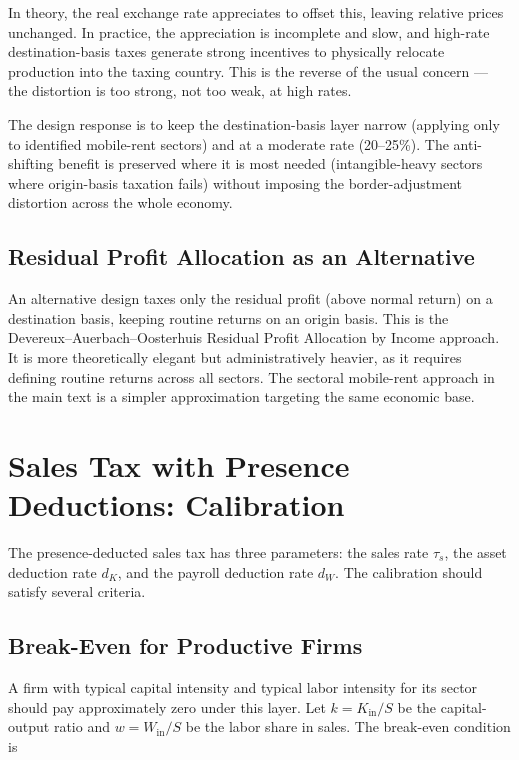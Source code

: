 \documentclass[11pt,a4paper]{article}
\begin{document}
In theory, the real exchange rate appreciates to offset this, leaving relative prices unchanged. In practice, the appreciation is incomplete and slow, and high-rate destination-basis taxes generate strong incentives to physically relocate production into the taxing country. This is the reverse of the usual concern — the distortion is too strong, not too weak, at high rates.

The design response is to keep the destination-basis layer narrow (applying only to identified mobile-rent sectors) and at a moderate rate (20--25\%). The anti-shifting benefit is preserved where it is most needed (intangible-heavy sectors where origin-basis taxation fails) without imposing the border-adjustment distortion across the whole economy.

\subsection{Residual Profit Allocation as an Alternative}

An alternative design taxes only the residual profit (above normal return) on a destination basis, keeping routine returns on an origin basis. This is the Devereux--Auerbach--Oosterhuis Residual Profit Allocation by Income approach. It is more theoretically elegant but administratively heavier, as it requires defining routine returns across all sectors. The sectoral mobile-rent approach in the main text is a simpler approximation targeting the same economic base.

\section{Sales Tax with Presence Deductions: Calibration}

The presence-deducted sales tax has three parameters: the sales rate $\tau_s$, the asset deduction rate $d_K$, and the payroll deduction rate $d_W$. The calibration should satisfy several criteria.

\subsection{Break-Even for Productive Firms}

A firm with typical capital intensity and typical labor intensity for its sector should pay approximately zero under this layer. Let $k = K_{\text{in}} / S$ be the capital-output ratio and $w = W_{\text{in}} / S$ be the labor share in sales. The break-even condition is
\end{document}
